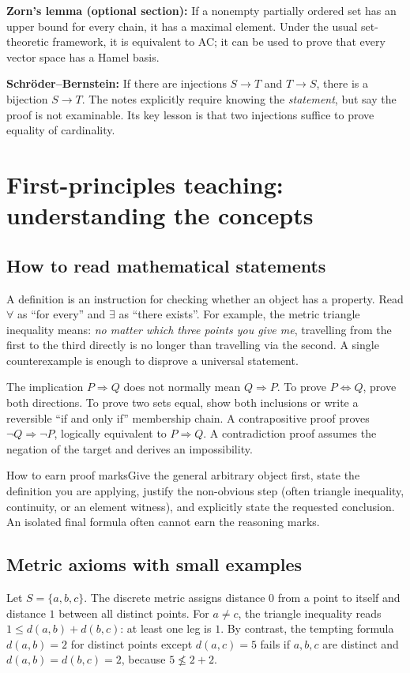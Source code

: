 \documentclass[11pt,a4paper]{article}
\begin{document}
\textbf{Zorn's lemma (optional section):} If a nonempty partially ordered set has an upper bound for every chain, it has a maximal element. Under the usual set-theoretic framework, it is equivalent to AC; it can be used to prove that every vector space has a Hamel basis.

\textbf{Schr\"oder--Bernstein:} If there are injections $S\to T$ and $T\to S$, there is a bijection $S\to T$. The notes explicitly require knowing the \emph{statement}, but say the proof is not examinable. Its key lesson is that two injections suffice to prove equality of cardinality.

\newpage
\section{First-principles teaching: understanding the concepts}
\subsection{How to read mathematical statements}
A definition is an instruction for checking whether an object has a property. Read $\forall$ as ``for every'' and $\exists$ as ``there exists''. For example, the metric triangle inequality means: \emph{no matter which three points you give me}, travelling from the first to the third directly is no longer than travelling via the second. A single counterexample is enough to disprove a universal statement.

The implication $P\Rightarrow Q$ does not normally mean $Q\Rightarrow P$. To prove $P\iff Q$, prove both directions. To prove two sets equal, show both inclusions or write a reversible ``if and only if'' membership chain. A contrapositive proof proves $\neg Q\Rightarrow\neg P$, logically equivalent to $P\Rightarrow Q$. A contradiction proof assumes the negation of the target and derives an impossibility.
\begin{tipbox}{How to earn proof marks}Give the general arbitrary object first, state the definition you are applying, justify the non-obvious step (often triangle inequality, continuity, or an element witness), and explicitly state the requested conclusion. An isolated final formula often cannot earn the reasoning marks.\end{tipbox}
\subsection{Metric axioms with small examples}
Let $S=\{a,b,c\}$. The discrete metric assigns distance $0$ from a point to itself and distance $1$ between all distinct points. For $a\ne c$, the triangle inequality reads $1\le d(a,b)+d(b,c)$: at least one leg is $1$. By contrast, the tempting formula $d(a,b)=2$ for distinct points except $d(a,c)=5$ fails if $a,b,c$ are distinct and $d(a,b)=d(b,c)=2$, because $5\nleq 2+2$.
\end{document}
